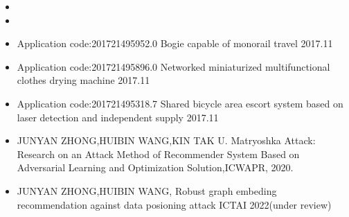\newpage
{}
  \begin{itemize}[leftmargin=*]
    \item {}
    \item {}
    
  \end{itemize}
  \begin{itemize}[leftmargin=*]
    \item{Application code:201721495952.0 Bogie capable of monorail travel 2017.11}
    \item {Application code:201721495896.0 Networked miniaturized multifunctional 
clothes drying machine 2017.11}
    \item {Application code:201721495318.7 Shared bicycle area escort system based 
on laser detection and independent supply 2017.11}
     \item {JUNYAN ZHONG,HUIBIN WANG,KIN TAK U. Matryoshka Attack: Research on an Attack Method of Recommender System Based on Adversarial Learning and Optimization Solution,ICWAPR, 2020. } 
     \item{JUNYAN ZHONG,HUIBIN WANG, Robust graph embeding recommendation against data posioning attack ICTAI 2022(under review)
}
  \end{itemize}